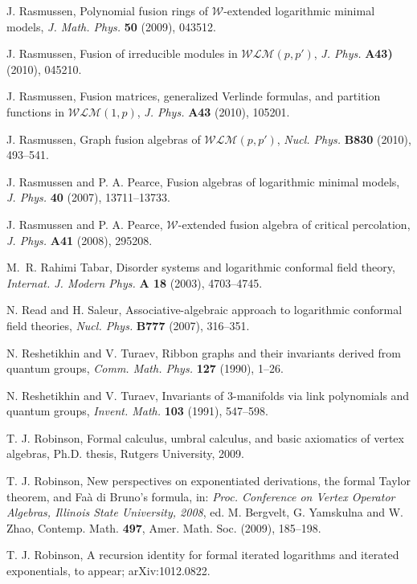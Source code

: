 \documentclass[12pt]{article}
\begin{document}
\begin{thebibliography}{FGST2}
J. Rasmussen, Polynomial fusion rings of $\mathcal{W}$-extended logarithmic minimal models, 
{\it J. Math. Phys.} {\bf 50} (2009), 043512.

J. Rasmussen, Fusion of irreducible modules in $\mathcal{WLM}(p,p')$,
{\it J. Phys.} {\bf A43)} (2010), 045210.

J. Rasmussen, Fusion matrices, generalized Verlinde formulas, and partition 
functions in $\mathcal{WLM}(1,p)$, {\it J. Phys.} {\bf A43} (2010), 105201.

J. Rasmussen, Graph fusion algebras of $\mathcal{WLM}(p,p')$, {\it Nucl. Phys.} {\bf B830} 
(2010), 493--541.

J. Rasmussen and P. A. Pearce, Fusion algebras of logarithmic minimal models, 
{\it J. Phys.} {\bf 40} (2007), 13711--13733.

J. Rasmussen and P. A. Pearce, $\mathcal{W}$-extended fusion algebra of critical percolation, 
{\it J. Phys.} {\bf A41} (2008), 295208.

M.~R. Rahimi Tabar, Disorder systems and logarithmic
conformal field theory, {\em  Internat. J. Modern Phys.} {\bf A 18} (2003),
4703--4745.

N. Read and H. Saleur, Associative-algebraic approach to logarithmic
conformal field theories, {\em Nucl. Phys.} {\bf B777} (2007),
316--351.

N. Reshetikhin and V. Turaev, Ribbon graphs and their invariants derived 
{}from quantum groups, {\em Comm. Math. Phys.} {\bf 127} (1990), 1--26.

N. Reshetikhin and V. Turaev, Invariants of $3$-manifolds 
via link polynomials and quantum groups, {\it Invent. Math.}
{\bf 103} (1991), 547--598.

T. J. Robinson, Formal calculus, umbral calculus, and basic axiomatics
of vertex algebras, Ph.D. thesis, Rutgers University, 2009.

T. J. Robinson, New perspectives on exponentiated derivations, the
formal Taylor theorem, and Fa\`a di Bruno's formula, in: {\em
Proc. Conference on Vertex Operator Algebras, Illinois State
University, 2008}, ed. M. Bergvelt, G. Yamskulna and W. Zhao,
Contemp. Math. {\bf 497}, Amer. Math. Soc. (2009), 185--198.

T. J. Robinson, A recursion identity for formal iterated logarithms
and iterated exponentials, to appear; arXiv:1012.0822.


\end{thebibliography}
\end{document}

